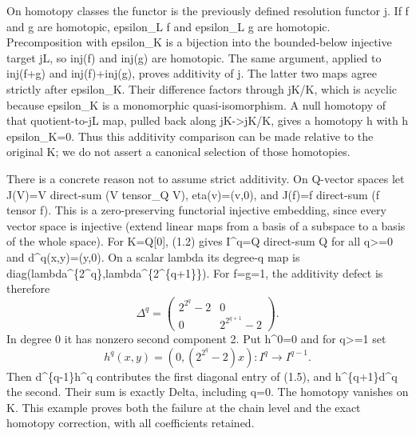 On homotopy classes the functor is the previously defined resolution functor j. If f and g are homotopic,\allowbreak{} epsilon\_\allowbreak{}L f and epsilon\_\allowbreak{}L g are homotopic. Precomposition with epsilon\_\allowbreak{}K is a bijection into the bounded-below injective target jL,\allowbreak{} so inj(f)\allowbreak{} and inj(g)\allowbreak{} are homotopic. The same argument,\allowbreak{} applied to inj(f\allowbreak{}+g)\allowbreak{} and inj(f)\allowbreak{}\allowbreak{}+inj(g)\allowbreak{},\allowbreak{} proves additivity of j. The latter two maps agree strictly after epsilon\_\allowbreak{}K. Their difference factors through jK/\allowbreak{}K,\allowbreak{} which is acyclic because epsilon\_\allowbreak{}K is a monomorphic quasi-isomorphism. A null homotopy of that quotient-to-jL map,\allowbreak{} pulled back along jK\allowbreak{}->jK/\allowbreak{}K,\allowbreak{} gives a homotopy h with h epsilon\_\allowbreak{}K\allowbreak{}=0. Thus this additivity comparison can be made relative to the original K; we do not assert a canonical selection of those homotopies.

There is a concrete reason not to assume strict additivity. On Q-vector spaces let J(V)\allowbreak{}\allowbreak{}=V direct-sum (V tensor\_\allowbreak{}Q V)\allowbreak{},\allowbreak{} eta(v)\allowbreak{}\allowbreak{}=(v,\allowbreak{}0)\allowbreak{},\allowbreak{} and J(f)\allowbreak{}\allowbreak{}=f direct-sum (f tensor f)\allowbreak{}. This is a zero-preserving functorial injective embedding,\allowbreak{} since every vector space is injective (extend linear maps from a basis of a subspace to a basis of the whole space)\allowbreak{}. For K\allowbreak{}=Q[0]\allowbreak{},\allowbreak{} (1.2)\allowbreak{} gives I\textasciicircum{}q\allowbreak{}=Q direct-sum Q for all q>\allowbreak{}=0 and d\textasciicircum{}q(x,\allowbreak{}y)\allowbreak{}\allowbreak{}=(y,\allowbreak{}0)\allowbreak{}. On a scalar lambda its degree-q map is diag(lambda\textasciicircum{}\{2\textasciicircum{}q\},\allowbreak{}lambda\textasciicircum{}\{2\textasciicircum{}\{q\allowbreak{}+1\}\})\allowbreak{}. For f\allowbreak{}=g\allowbreak{}=1,\allowbreak{} the additivity defect is therefore \[
 \Delta^q=
 \begin{pmatrix}2^{2^q}-2&0\\0&2^{2^{q+1}}-2\end{pmatrix}.
                                                               \tag{1.5}
\] In degree 0 it has nonzero second component 2. Put h\textasciicircum{}0\allowbreak{}=0 and for q>\allowbreak{}=1 set \[
 h^q(x,y)=(0,(2^{2^q}-2)x):I^q\longrightarrow I^{q-1}.
                                                               \tag{1.6}
\] Then d\^{}\{q-1\}h\^{}q contributes the first diagonal entry of (1.5)\allowbreak{},\allowbreak{} and h\textasciicircum{}\{q\allowbreak{}+1\}d\textasciicircum{}q the second. Their sum is exactly Delta,\allowbreak{} including q\allowbreak{}=0. The homotopy vanishes on K. This example proves both the failure at the chain level and the exact homotopy correction,\allowbreak{} with all coefficients retained.

